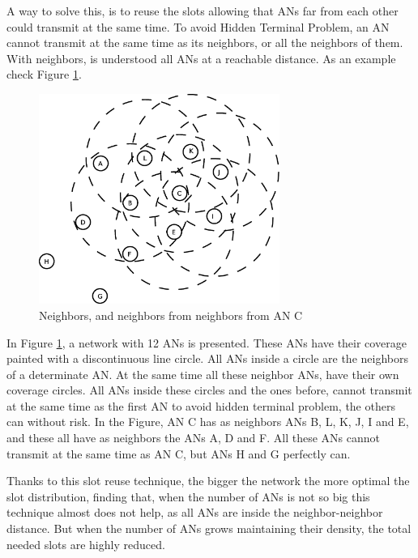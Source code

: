 A way to solve this, is to reuse the slots allowing that \acp{AN} far from each other could transmit at the same time. To avoid Hidden Terminal 
Problem, an \ac{AN} cannot transmit at the same time as its neighbors, or all the neighbors of them. With neighbors, is understood all \acp{AN} at a 
reachable distance. As an example check Figure \ref{fig:ejemplonetslots}.

\begin{figure}[ht]
 \begin{center}
  \includegraphics[width=0.7\textwidth]{ejemplonetslots.eps}
 \end{center}
 \caption{Neighbors, and neighbors from neighbors from \ac{AN} C}
 \label{fig:ejemplonetslots}
\end{figure}

In Figure \ref{fig:ejemplonetslots}, a network with 12 \acp{AN} is presented. These \acp{AN} have their coverage painted with a discontinuous line circle.
All \acp{AN} inside a circle are the neighbors of a determinate \ac{AN}. At the same time all these neighbor \acp{AN}, have their own coverage circles.
All \acp{AN} inside these circles and the ones before, cannot transmit at the same time as the first \ac{AN} to avoid hidden terminal problem, the others 
can without risk. In the Figure, \ac{AN} C has as neighbors \acp{AN} B, L, K, J, I and E, and these all have as neighbors the \acp{AN} A, D and F. All these
\acp{AN} cannot transmit at the same time as \ac{AN} C, but \acp{AN} H and G perfectly can.

Thanks to this slot reuse technique, the bigger the network the more optimal the slot distribution, finding that, when the number of \acp{AN} is not so big this 
technique almost does not help, as all \acp{AN} are inside the neighbor-neighbor distance. But when the number of \acp{AN} grows maintaining their density, 
the total needed slots are highly reduced.

